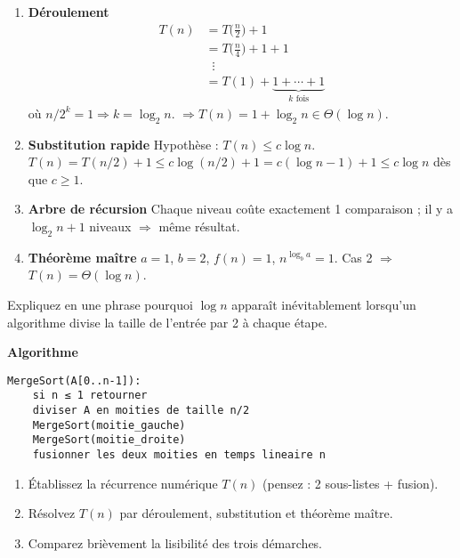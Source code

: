 \begin{enumerate}[label=\alph*)]
  \item \textbf{Déroulement}
        \[
        \begin{aligned}
        T(n)&=T\!\bigl(\tfrac{n}{2}\bigr)+1\\
             &=T\!\bigl(\tfrac{n}{4}\bigr)+1+1\\
             &\;\;\vdots\\
             &=T(1)+\underbrace{1+\cdots+1}_{k\text{ fois}}
        \end{aligned}
        \]
        où \(n/2^{k}=1\Rightarrow k=\log_2 n\).
        \(\Rightarrow T(n)=1+\log_2 n\in\Theta(\log n).\)

  \item \textbf{Substitution rapide}
        Hypothèse : \(T(n)\le c\log n\).
        \(T(n)=T(n/2)+1\le c\log(n/2)+1
               =c(\log n-1)+1\le c\log n\) dès que \(c\ge1\).

  \item \textbf{Arbre de récursion}
        Chaque niveau coûte exactement 1 comparaison ; il y a
        \(\log_2 n+1\) niveaux $\Rightarrow$ même résultat.

  \item \textbf{Théorème maître}
        $a=1$, $b=2$, $f(n)=1$, \(n^{\log_b a}=1\).
        Cas 2 $\Rightarrow$ \(T(n)=\Theta(\log n)\).
\end{enumerate}

\begin{exercice}[Discussion]
Expliquez en une phrase pourquoi \(\log n\) apparaît inévitablement lorsqu’un
algorithme divise la taille de l’entrée par 2 à chaque étape.
\end{exercice}

\begin{exercice}
\textbf{Algorithme}
\begin{lstlisting}
MergeSort(A[0..n-1]):
    si n ≤ 1 retourner
    diviser A en moities de taille n/2
    MergeSort(moitie_gauche)
    MergeSort(moitie_droite)
    fusionner les deux moities en temps lineaire n
\end{lstlisting}

\begin{enumerate}[label=\alph*)]
  \item Établissez la récurrence numérique $T(n)$ (pensez : 2 sous-listes +
        fusion).
  \item Résolvez $T(n)$ par déroulement, substitution et théorème maître.
  \item Comparez brièvement la lisibilité des trois démarches.
\end{enumerate}
\end{exercice}

